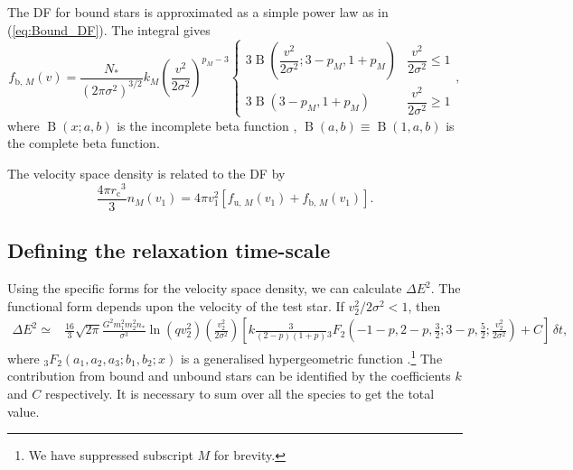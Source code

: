 \documentclass[useAMS,usedcolumn,usegraphicx,usenatbib]{mn2e}
\newcommand{\eqnref}[1]{(\ref{eq:#1})}
\DeclareMathOperator{\Beta}{B}
\newcommand{\sub}[1]{\ensuremath{_\mathrm{#1}}}
\begin{document}
\begin{onecolumn}
The DF for bound stars is approximated as a simple power law as in \eqnref{Bound_DF}. The integral gives
\begin{equation}
f_{\mathrm{b},\,M}(v) = \frac{N_\ast}{\left(2\pi\sigma^2\right)^{3/2}}k_M \left(\frac{v^2}{2\sigma^2}\right)^{p_M - 3}\begin{cases}
3 \Beta\left(\dfrac{v^2}{2\sigma^2}; 3 - p_M, 1 + p_M\right) & \dfrac{v^2}{2\sigma^2} \leq 1 \\
3 \Beta\left(3 - p_M, 1 + p_M\right) & \dfrac{v^2}{2\sigma^2} \geq 1
\end{cases},
\end{equation}
where $\Beta(x;a,b)$ is the incomplete beta function \citep[8.17]{Olver2010}, $\Beta(a,b) \equiv \Beta(1,a,b)$ is the complete beta function.

The velocity space density is related to the DF by
\begin{equation}
\frac{4\pi r\sub{c}^3}{3}n_M(v_1) = 4\pi v_1^2\left[f_{\mathrm{u},\,M}(v_1) + f_{\mathrm{b},\,M}(v_1)\right].
\end{equation}

\subsection{Defining the relaxation time-scale}

Using the specific forms for the velocity space density, we can calculate $\Delta E^2$. The functional form depends upon the velocity of the test star. If $v_2^2/2\sigma^2 < 1$, then
\begin{align}
\Delta E^2 \simeq {} & \frac{16}{3}\sqrt{2\pi}\frac{G^2m_1^2 m_2^2n_\ast}{\sigma^3}\ln\left(qv_2^2\right) \left(\frac{v_2^2}{2\sigma^2}\right) \left[k \frac{3}{(2 - p)(1 + p)}{_3F_2}\left(-1-p,2-p,\frac{3}{2};3-p,\frac{5}{2};\frac{v_2^2}{2\sigma^2}\right) + C\right]\,\delta t,
\end{align}
where ${_3F_2}(a_1,a_2,a_3;b_1,b_2;x)$ is a generalised hypergeometric function \citep[section 16]{Olver2010}.\footnote{We have suppressed subscript $M$ for brevity.} The contribution from bound and unbound stars can be identified by the coefficients $k$ and $C$ respectively. It is necessary to sum over all the species to get the total value.


\end{onecolumn}
\end{document}
